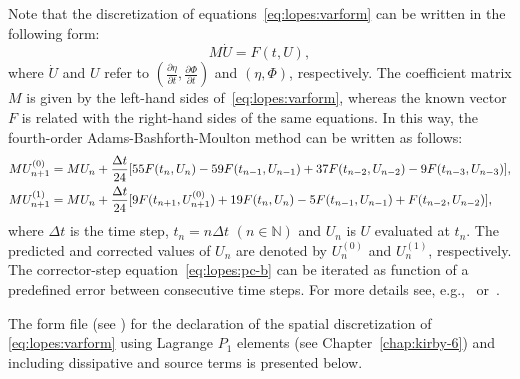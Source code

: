 Note that the discretization of equations~\eqref{eq:lopes:varform} can
be written in the following form:
\begin{equation}
  M\dot U=F(t,U),
\end{equation}
where $\dot U$ and $U$ refer to $\displaystyle \left(\frac{\partial
\eta}{\partial t},\frac{\partial \Phi}{\partial t}\right)$ and
$(\eta,\Phi)$, respectively.  The coefficient matrix $M$ is given by
the left-hand sides of~\eqref{eq:lopes:varform}, whereas the known
vector $F$ is related with the right-hand sides of the same equations.
In this way, the fourth-order Adams-Bashforth-Moulton method can be
written as follows:
\begin{subequations}
  \label{eq:lopes:pc}
  \begin{align}
    &\displaystyle MU^{(0)}_{n+1} = MU_n+\frac{\Delta
      t}{24}[55{F}(t_n,U_n) - 59{F}(t_{n-1},U_{n-1}) +
    37{F}(t_{n-2},U_{n-2})-9{F}(t_{n-3},U_{n-3})],
    \vspace{0.3cm}
    \label{eq:lopes:pc-a}\\
    \displaystyle
    &MU^{(1)}_{n+1}=MU_n+\frac{\Delta
      t}{24}[9{F}(t_{n+1},U^{(0)}_{n+1}) + 19{F}(t_n,U_n)-
    5{F}(t_{n-1},U_{n-1}) + {F}(t_{n-2},U_{n-2})],
    \label{eq:lopes:pc-b}
  \end{align}
\end{subequations}
where $\Delta t$ is the time step, $t_n=n\Delta t$ $(n\in \mathbb{N})$
and $U_n$ is $U$ evaluated at $t_n$.  The predicted and corrected
values of $U_n$ are denoted by $U_n^{(0)}$ and $U_n^{(1)}$,
respectively.  The corrector-step equation~\eqref{eq:lopes:pc-b} can
be iterated as function of a predefined error between consecutive time
steps.  For more details see, e.g.,~\citet{HairerWanner1991a}
or~\citet{Lambert1991}.

The \ufl form file (see ) for the
declaration of the spatial discretization of \eqref{eq:lopes:varform}
using Lagrange $P_1$ elements (see Chapter~\ref{chap:kirby-6}) and
including dissipative and source terms is presented below.

